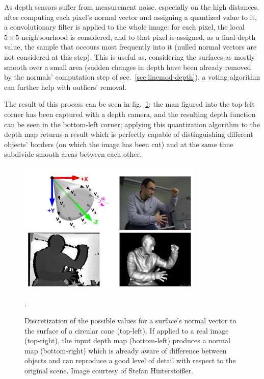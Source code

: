 As depth sensors suffer from measurement noise, especially on the high
distances, after computing each pixel's normal vector and assigning a
quantized value to it, a convolutionary filter is applied to the whole
image: for each pixel, the local $5\times 5$ neighbourhood is
considered, and to that pixel is assigned, as a final depth value, the
sample that occours most frequently into it (nulled normal vectors are
not considered at this step). This is useful as,
considering the surfaces as mostly smooth over a small area (sudden
changes in depth have been already removed by the normals' computation
step of sec.~\ref{sec:linemod-depth}), a voting algorithm can further
help with outliers' removal.

The result of this process can be seen in fig.~\ref{fig:depth-man}:
the man figured into the top-left corner has been captured with a
depth camera, and the resulting depth function can be seen in the
bottom-left corner; applying this quantization algorithm to the depth
map returns a result which is perfectly capable of distinguishing
different objects' borders (on which the image has been cut) and at
the same time subdivide smooth areas between each other.

\begin{figure}[htbp]
\centering
\includegraphics[height=2.5in]{./Graphics/depth-man}
\caption{Discretization of the possible values for a surface's normal
  vector to the surface of a circular cone (top-left). If applied to a
  real image (top-right), the input depth map (bottom-left) produces a
  normal map (bottom-right) which is already aware of difference
  between objects and can reproduce a good level of detail with
  respect to the original scene. Image courtesy of Stefan Hinterstoi\ss er. \label{fig:depth-man}}.
\end{figure}

